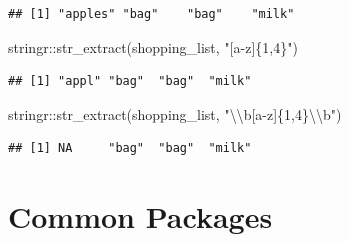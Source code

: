 \documentclass[
]{article}
\newenvironment{Shaded}{\begin{snugshade}}{\end{snugshade}}
\newcommand{\FunctionTok}[1]{\textcolor[rgb]{0.00,0.00,0.00}{#1}}
\newcommand{\NormalTok}[1]{#1}
\newcommand{\SpecialCharTok}[1]{\textcolor[rgb]{0.00,0.00,0.00}{#1}}
\newcommand{\StringTok}[1]{\textcolor[rgb]{0.31,0.60,0.02}{#1}}
\begin{document}
\begin{verbatim}
## [1] "apples" "bag"    "bag"    "milk"
\end{verbatim}

\begin{Shaded}
\begin{Highlighting}[]
\NormalTok{stringr}\SpecialCharTok{::}\FunctionTok{str\_extract}\NormalTok{(shopping\_list, }\StringTok{"[a{-}z]\{1,4\}"}\NormalTok{)}
\end{Highlighting}
\end{Shaded}

\begin{verbatim}
## [1] "appl" "bag"  "bag"  "milk"
\end{verbatim}

\begin{Shaded}
\begin{Highlighting}[]
\NormalTok{stringr}\SpecialCharTok{::}\FunctionTok{str\_extract}\NormalTok{(shopping\_list, }\StringTok{"}\SpecialCharTok{\textbackslash{}\textbackslash{}}\StringTok{b[a{-}z]\{1,4\}}\SpecialCharTok{\textbackslash{}\textbackslash{}}\StringTok{b"}\NormalTok{)}
\end{Highlighting}
\end{Shaded}

\begin{verbatim}
## [1] NA     "bag"  "bag"  "milk"
\end{verbatim}

\hypertarget{common-packages}{%
\section{Common Packages}\label{common-packages}}
\end{document}
